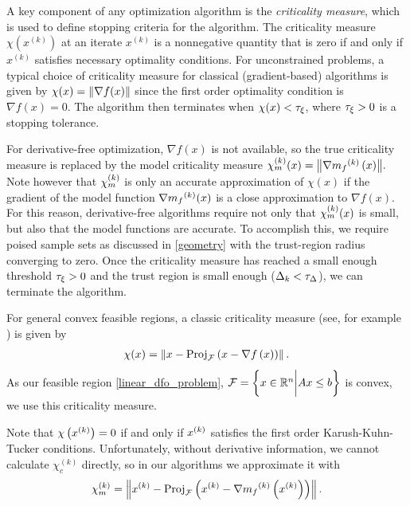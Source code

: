 \documentclass{article}
\begin{document}
A key component of any optimization algorithm is the {\em criticality measure}, which is used to define stopping criteria for the algorithm.
The criticality measure $\chi(x^{(k)})$ at an iterate $x^{(k)}$ is a nonnegative quantity that is zero if and only if $x^{(k)}$ satisfies necessary optimality conditions.
For unconstrained problems,  a typical choice of criticality measure for classical (gradient-based) algorithms is given by $\chi(x) = {\left\|\nabla f(x)\right\|}$
since the first order optimality condition is $\nabla f(x)=0$.
The algorithm then terminates when $\chi(x) < \tau_{\xi}$, where $\tau_{\xi} >0$ is a stopping tolerance.

For derivative-free optimization,  $\nabla f(x)$ is not available,  so the true criticality measure is replaced by the model criticality measure
${\chi_m^{(k)}}(x) = {\left\|\nabla {{m}_f}^{(k)}\left(x\right)\right\|}.$
Note however that ${\chi_m^{(k)}}$ is only an accurate approximation of $\chi(x)$ if the gradient of the model function $\nabla {{m}_f}^{(k)}(x)$ is a close approximation to $\nabla f(x)$.
For this reason, derivative-free algorithms require not only that ${\chi_m^{(k)}}(x)$ is small, but also that the model functions are accurate.
To accomplish this, we require poised sample sets as discussed in \cref{geometry} with the trust-region radius converging to zero.
Once the criticality measure has reached a small enough threshold $\tau_{\xi} > 0$ and the trust region is small enough ($\Delta_k < \tau_{\Delta}$),
we can terminate the algorithm.



For general convex feasible regions,
a classic criticality measure (see, for example \cite{Conejo:2013:GCT:2620806.2621814} \cite{Conn:2000:TM:357813}) is given by
\begin{align*}
\chi(x) = \left\|x - {\textrm{Proj}}_{{\mathcal F}}\left(x- \nabla f\left(x\right)\right)\right\|.
\end{align*}
As our feasible region \cref{linear_dfo_problem},
${\mathcal F} = \left\{ x \in \mathbb R^n \bigg | Ax \le b \right\}$
is convex, we use this criticality measure.

Note that $\chi\left(x^{(k)}\right) = 0$ if and only if $x^{(k)}$ satisfies the first order Karush-Kuhn-Tucker conditions.
Unfortunately,  without derivative information, we cannot calculate $\chi_c^{(k)}$ directly,
so in our algorithms we approximate it with
\begin{align}
\label{define_criticality_measure}
{\chi_m^{(k)}} = \left\|x^{(k)} - {\textrm{Proj}}_{{\mathcal F}}\left(x^{(k)}- \nabla {{m}_f}^{(k)}\left(x^{(k)}\right)\right)\right\|.
\end{align}
\end{document}
